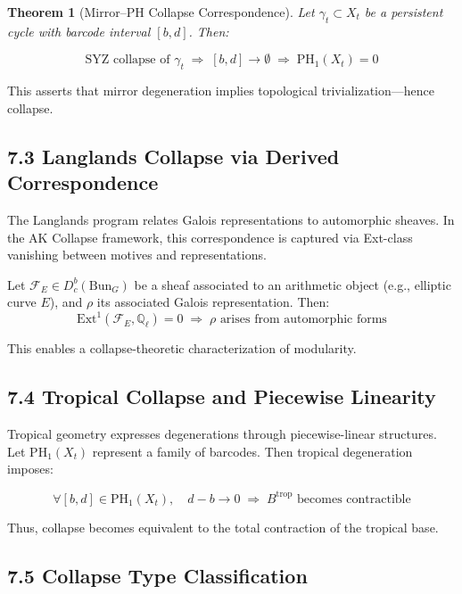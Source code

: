 \documentclass[11pt]{article}
\newtheorem{theorem}{Theorem}[section]
\begin{document}
\begin{theorem}[Mirror–PH Collapse Correspondence]
Let \( \gamma_t \subset X_t \) be a persistent cycle with barcode interval \( [b, d] \). Then:

\[
\text{SYZ collapse of } \gamma_t \;\Longrightarrow\; [b,d] \to \emptyset \;\Longrightarrow\; \mathrm{PH}_1(X_t) = 0
\]
\end{theorem}

This asserts that mirror degeneration implies topological trivialization—hence collapse.

\subsection*{7.3 Langlands Collapse via Derived Correspondence}

The Langlands program relates Galois representations to automorphic sheaves.  
In the AK Collapse framework, this correspondence is captured via Ext-class vanishing between motives and representations.

\begin{proposition}
Let \( \mathcal{F}_E \in D^b_c(\mathrm{Bun}_G) \) be a sheaf associated to an arithmetic object (e.g., elliptic curve \( E \)), and \( \rho \) its associated Galois representation.  
Then:
\[
\mathrm{Ext}^1(\mathcal{F}_E, \mathbb{Q}_\ell) = 0 \;\Longrightarrow\; \rho \text{ arises from automorphic forms}
\]

This enables a collapse-theoretic characterization of modularity.
\end{proposition}

\subsection*{7.4 Tropical Collapse and Piecewise Linearity}

Tropical geometry expresses degenerations through piecewise-linear structures.  
Let \( \mathrm{PH}_1(X_t) \) represent a family of barcodes. Then tropical degeneration imposes:

\[
\forall [b,d] \in \mathrm{PH}_1(X_t), \quad d - b \to 0 \;\Rightarrow\; B^{\mathrm{trop}} \text{ becomes contractible}
\]

Thus, collapse becomes equivalent to the total contraction of the tropical base.

\subsection*{7.5 Collapse Type Classification}
\end{document}
